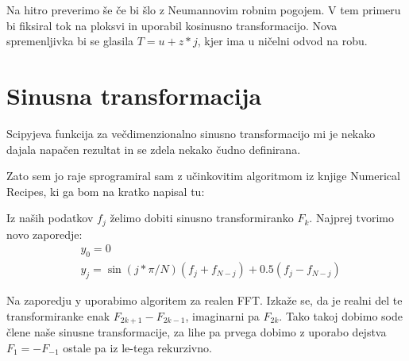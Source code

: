 \documentclass{article}
\begin{document}
Na hitro preverimo še če bi šlo z Neumannovim robnim pogojem. V tem primeru bi fiksiral tok na ploksvi in uporabil kosinusno transformacijo.
Nova spremenljivka bi se glasila $T = u + z* j$, kjer ima u ničelni odvod na robu. 


\section{Sinusna transformacija}

Scipyjeva funkcija za večdimenzionalno sinusno transformacijo mi je nekako dajala napačen rezultat in se zdela nekako čudno definirana.

Zato sem jo raje sprogramiral sam z učinkovitim algoritmom iz knjige Numerical Recipes, ki ga bom na kratko napisal tu:

Iz naših podatkov $f_j$ želimo dobiti sinusno transformiranko $F_k$. Najprej tvorimo novo zaporedje:
\begin{align*}
&y_0 = 0 \\
&y_j = \sin(j*\pi/N) (f_j + f_{N-j}) + 0.5(f_j - f_{N-j}) 
\end{align*}

Na zaporedju y uporabimo algoritem za realen FFT. Izkaže se, da je realni del te transformiranke enak $F_{2k+1} - F_{2k-1}$, imaginarni pa $F_{2k}$.
Tako takoj dobimo sode člene naše sinusne transformacije, za lihe pa prvega dobimo z uporabo dejstva $F_1 = -F_{-1}$ ostale pa iz le-tega rekurzivno.
\end{document}
